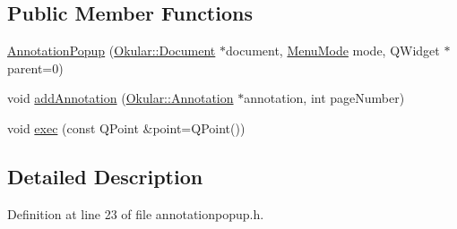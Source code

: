 \subsection*{Public Member Functions}
\begin{DoxyCompactItemize}
\item 
\hyperlink{classAnnotationPopup_a239651270ccd047fcba04c71f7b49a45}{Annotation\+Popup} (\hyperlink{classOkular_1_1Document}{Okular\+::\+Document} $\ast$document, \hyperlink{classAnnotationPopup_af8654f3f9c2a3377f86daf329f1e0679}{Menu\+Mode} mode, Q\+Widget $\ast$parent=0)
\item 
void \hyperlink{classAnnotationPopup_a3235e948e6dcc5ec49dc38df56d89a9c}{add\+Annotation} (\hyperlink{classOkular_1_1Annotation}{Okular\+::\+Annotation} $\ast$annotation, int page\+Number)
\item 
void \hyperlink{classAnnotationPopup_a54b930f61b3d40661d0af18667a1573f}{exec} (const Q\+Point \&point=Q\+Point())
\end{DoxyCompactItemize}


\subsection{Detailed Description}


Definition at line 23 of file annotationpopup.\+h.



